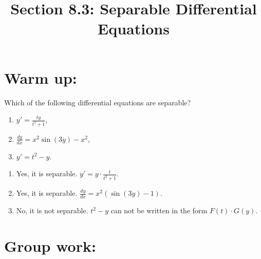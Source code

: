\documentclass[noinstructornotes]{ximera}
\title{Section 8.3: Separable Differential Equations}
\begin{document}
\begin{abstract}		\end{abstract}
\maketitle




\section{Warm up:}
	Which of the following differential equations are separable?
	\begin{enumerate}
	\item $y' = \frac{ty}{t^2+1}$,
	\item $\frac{dy}{dx} =x^2 \sin (3y) -x^2$,
	\item $y' = t^2 - y$.
	\end{enumerate}

	\begin{freeResponse}
	\begin{enumerate}
	\item Yes, it is separable. $y' = y \cdot \frac{t}{t^2+1}$.
	\item Yes, it is separable. $\frac{dy}{dx} = x^2 \left( \sin(3y)-1 \right)$.
	\item No, it is not separable. $t^2-y$ can not be written in the form $F(t) \cdot G(y)$. 
	\end{enumerate}
	\end{freeResponse}
	
\begin{instructorNotes}

\end{instructorNotes}








\section{Group work:}
\end{document}
